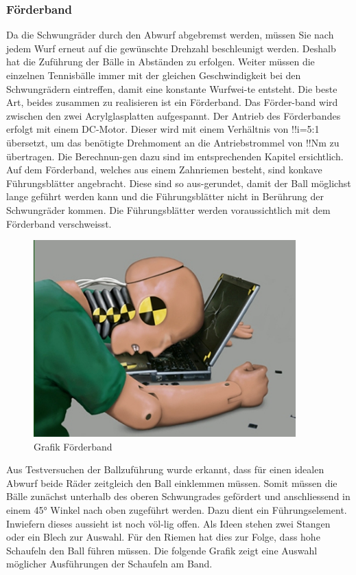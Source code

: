 \subsubsection{Förderband}
Da die Schwungräder durch den Abwurf abgebremst werden, müssen Sie nach jedem Wurf erneut auf die gewünschte Drehzahl beschleunigt werden. Deshalb hat die Zuführung der Bälle in Abständen zu erfolgen. Weiter müssen die einzelnen Tennisbälle immer mit der gleichen Geschwindigkeit bei den Schwungrädern eintreffen, damit eine konstante Wurfwei-te entsteht. Die beste Art, beides zusammen zu realisieren ist ein Förderband. Das Förder-band wird zwischen den zwei Acrylglasplatten aufgespannt. Der Antrieb des Förderbandes erfolgt mit einem DC-Motor. Dieser wird mit einem Verhältnis von !!i=5:1 übersetzt, um das benötigte Drehmoment an die Antriebstrommel von !!Nm zu übertragen. Die Berechnun-gen dazu sind im entsprechenden Kapitel ersichtlich. Auf dem Förderband, welches aus einem Zahnriemen besteht, sind konkave Führungsblätter angebracht. Diese sind so aus-gerundet, damit der Ball möglichst lange geführt werden kann und die Führungsblätter nicht in Berührung der Schwungräder kommen. Die Führungsblätter werden voraussichtlich mit dem Förderband verschweisst.
\begin{figure}
	\centering
	\includegraphics[width=0.9\textwidth]{Enddokumentation/CrashTestDummy.jpg}
	\caption{Grafik Förderband}
	\label{fig:Grafik Förderband}	
\end{figure}
Aus Testversuchen der Ballzuführung wurde erkannt, dass für einen idealen Abwurf beide Räder zeitgleich den Ball einklemmen müssen. Somit müssen die Bälle zunächst unterhalb des oberen Schwungrades gefördert und anschliessend in einem 45° Winkel nach oben zugeführt werden. Dazu dient ein Führungselement. Inwiefern dieses aussieht ist noch völ-lig offen. Als Ideen stehen zwei Stangen oder ein Blech zur Auswahl. Für den Riemen hat dies zur Folge, dass hohe Schaufeln den Ball führen müssen. Die folgende Grafik zeigt eine Auswahl möglicher Ausführungen der Schaufeln am Band.
